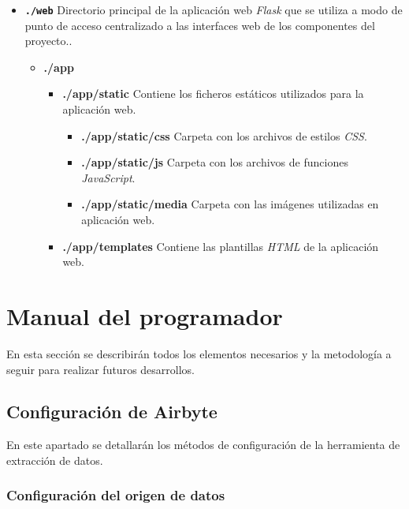 \begin{itemize}
    \item \textbf{\texttt{./web}} Directorio principal de la aplicación web \textit{Flask} que se utiliza a modo de punto de acceso centralizado a las interfaces web de los componentes del proyecto..
    \begin{itemize}
        \item \textbf{./app} 
        \begin{itemize}
            \item \textbf{./app/static} Contiene los ficheros estáticos utilizados para la aplicación web.
                \begin{itemize}
                    \item \textbf{./app/static/css} Carpeta con los archivos de estilos \textit{CSS}.
                    \item \textbf{./app/static/js} Carpeta con los archivos de funciones \textit{JavaScript}.
                    \item \textbf{./app/static/media} Carpeta con las imágenes utilizadas en aplicación web.
                \end{itemize}
            \item \textbf{./app/templates} Contiene las plantillas \textit{HTML} de la aplicación web.
        \end{itemize}

    \end{itemize}

\end{itemize}


\section{Manual del programador}

En esta sección se describirán todos los elementos necesarios y la metodología a seguir para realizar futuros desarrollos.

\subsection{Configuración de Airbyte}

En este apartado se detallarán los métodos de configuración de la herramienta de extracción de datos.

\subsubsection{Configuración del origen de datos}

